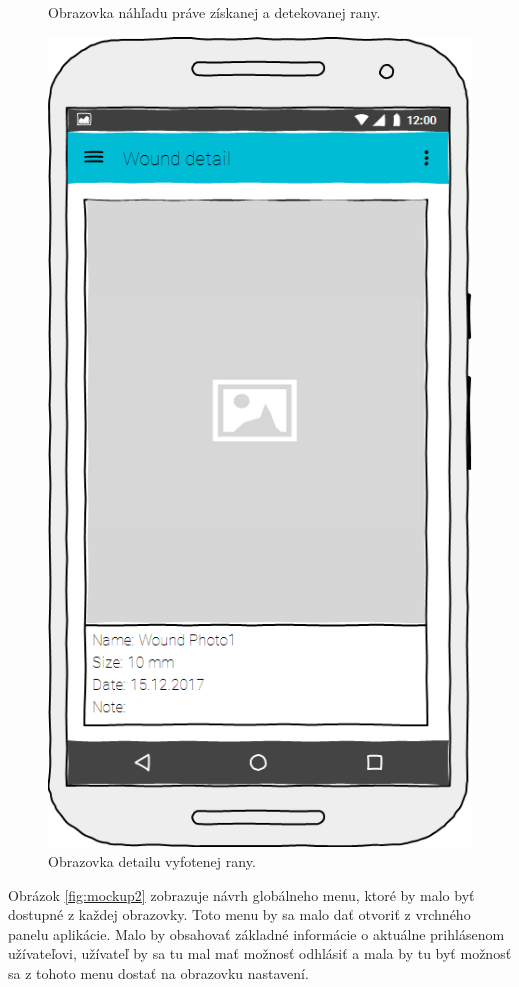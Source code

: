 \begin{figure}[h]
\begin{minipage}{0.48\textwidth}
      \caption{Obrazovka náhľadu práve získanej a detekovanej rany.}
      \label{fig:mockup6}
   \end{minipage}\hfill
   \begin {minipage}{0.48\textwidth}
     \centering
     \includegraphics[scale=0.45]{fig/mockup7.png}
      \caption{Obrazovka detailu vyfotenej rany.}
      \label{fig:mockup7}
   \end{minipage}
\end{figure}

Obrázok \ref{fig:mockup2} zobrazuje návrh globálneho menu, ktoré by malo byť dostupné z každej obrazovky. Toto menu by sa malo dať otvoriť z vrchného panelu aplikácie. Malo by obsahovať základné informácie o aktuálne prihlásenom užívateľovi, užívateľ by sa tu mal mať možnosť odhlásiť a mala by tu byť možnosť sa z tohoto menu dostať na obrazovku nastavení.
	
